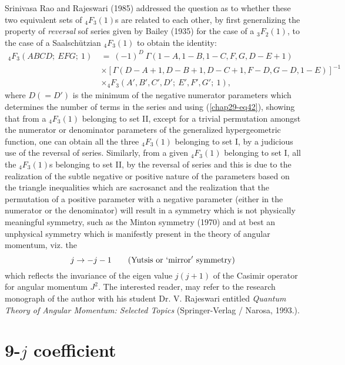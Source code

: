 Srinivasa Rao and Rajeswari (1985) addressed the question as to whether these 
two equivalent sets of $_4F_3(1)$s are related to each other, by first generalizing 
the property of \textit{reversal} sof series given by Bailey (1935) for the case of a
$_3F_2(1)$, to the case of a Saalschützian $_4F_3(1)$ to obtain the identity:
\begin{equation}
\begin{split}
{}_4F_3(ABCD;\ EFG;\ 1)\ & =\ (-1)^D\ \Gamma(1-A,1-B,1-C,F,G,D-E+1)\\
& \times [\Gamma(D-A+1, D-B+1, D-C+1, F-D, G-D, 1-E)]^{-1}\\
& \times {}_4F_3(A',B',C',D';\ E',F',G';\ 1), \label{chap29-eq42}
\end{split}
\end{equation}
where $D(=D')$ is the minimum of the negative numerator parameters which determines 
the number of terms in the series and using (\eqref{chap29-eq42}), showing that from a $_4F_3(1)$ 
belonging to set II, except for a trivial permutation amongst the numerator or 
denominator parameters of the generalized hypergeometric function, one can obtain 
all the three $_4F_3(1)$ belonging to set I, by a judicious use of the reversal 
of series. Similarly, from a given $_4F_3(1)$ belonging to set I, all the 
$_4F_3(1)$s belonging to set II, by the reversal of series and this is due to the 
realization of the subtle negative or positive nature of the parameters based on 
the triangle inequalities which are sacrosanct and the realization that the permutation 
of a positive parameter with a negative parameter (either in the numerator or the 
denominator) will result in a symmetry which is not physically meaningful symmetry, 
such as the Minton symmetry (1970) and at best an unphysical symmetry which is 
manifestly present in the theory of angular momentum, viz. the
\begin{equation} 
j\rightarrow -j-1 \qquad ({\rm Yutsis\ or\ `mirror'\ symmetry}) \label{chap29-eq43}
\end{equation}
which reflects the invariance of the eigen value $j(j+1)$ of the Casimir operator 
for angular momentum $J^2$. The interested reader, may refer to the research monograph 
of the author with his student Dr. V. Rajeswari entitled \textit{Quantum Theory of Angular Momentum: Selected Topics} (Springer-Verlag / Narosa, 1993.).


\section*{9-$j$ coefficient}

